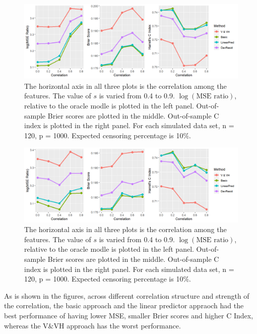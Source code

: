 \documentclass{article}
\begin{document}
\begin{figure}[ht]
  \centering
  \includegraphics[width=\textwidth]{figure_2_ex.png}
  \caption{\label{Fig:ex} The horizontal axis in all three plots is the correlation among the features. The value of $s$ is varied from 0.4 to 0.9.  $\log(\text{MSE ratio})$, relative to the oracle modle is plotted in the left panel. Out-of-sample Brier scores are plotted in the middle. Out-of-sample C index is plotted in the right panel. For each simulated data set, n = 120, p = 1000. Expected censoring percentage is 10$\%$.}
\end{figure}	

\begin{figure}[ht]
  \centering
  \includegraphics[width=\textwidth]{figure_2_auto.png}
  \caption{\label{Fig:auto} The horizontal axis in all three plots is the correlation among the features. The value of $s$ is varied from 0.4 to 0.9.  $\log(\text{MSE ratio})$, relative to the oracle modle is plotted in the left panel. Out-of-sample Brier scores are plotted in the middle. Out-of-sample C index is plotted in the right panel. For each simulated data set, n = 120, p = 1000. Expected censoring percentage is 10$\%$.}
\end{figure}	

As is shown in the figures, across different correlation structure and strength of the correlation, the basic approach and the linear predictor appraoch had the best performance of having lower MSE, smaller Brier scores and higher C Index, whereas the V$\&$VH approach has the worst performance.
\end{document}
